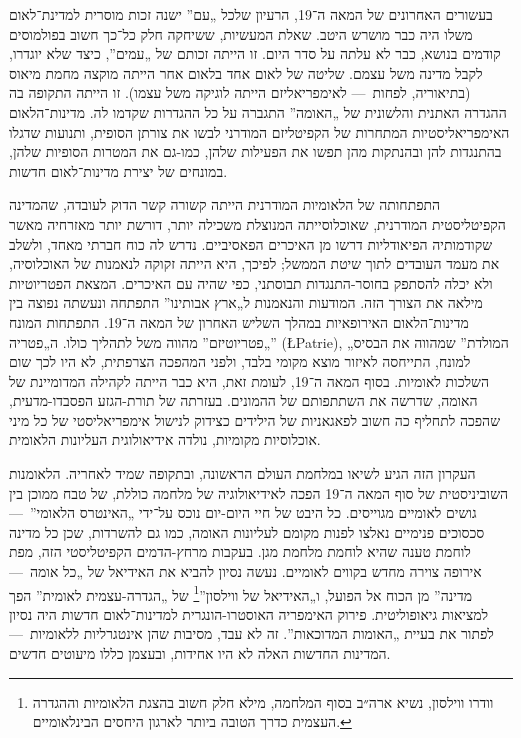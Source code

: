 בעשורים האחרונים של המאה ה־19, הרעיון שלכל „עם” ישנה זכות מוסרית למדינת־לאום משלו היה כבר מושרש היטב. שאלת המעשיות, ששיחקה חלק כל־כך חשוב בפולמוסים קודמים בנושא, כבר לא עלתה על סדר היום. זו הייתה זכותם של „עמים”, כיצד שלא יוגדרו, לקבל מדינה משל עצמם. שליטה של לאום אחד בלאום אחר הייתה מוקצה מחמת מיאוס (בתיאוריה, לפחות~— לאימפריאליזם הייתה לוגיקה משל עצמו). זו הייתה התקופה בה ההגדרה האתנית והלשונית של „האומה” התגברה על כל ההגדרות שקדמו לה. מדינות־הלאום האימפריאליסטיות המתחרות של הקפיטליזם המודרני לבשו את צורתן הסופית, ותנועות שדגלו בהתנגדות להן ובהנתקות מהן תפשו את הפעילות שלהן, כמו-גם את המטרות הסופיות שלהן, במונחים של יצירת מדינות־לאום חדשות.

התפתחותה של הלאומיות המודרנית הייתה קשורה קשר הדוק לעובדה, שהמדינה הקפיטליסטית המודרנית, שאוכלוסייתה המנוצלת משכילה יותר, דורשת יותר מאזרחיה מאשר שקודמותיה הפיאודליות דרשו מן האיכרים הפאסיביים. נדרש לה כוח חברתי מאחד, ולשלב את מעמד העובדים לתוך שיטת הממשל; לפיכך, היא הייתה זקוקה לנאמנות של האוכלוסיה, ולא יכלה להסתפק בחוסר-התנגדות תבוסתני, כפי שהיה עם האיכרים. המצאת הפטריוטיות מילאה את הצורך הזה. המודעות והנאמנות ל„ארץ אבותינו” התפתחה ונעשתה נפוצה בין מדינות־הלאום האירופאיות במהלך השליש האחרון של המאה ה־19. התפתחות המונח „פטריוטיזם” מהווה משל לתהליך כולו. ה„פטריה” (\L{Patrie}), „המולדת” שמהווה את הבסיס למונח, התייחסה לאיזור מוצא מקומי בלבד, ולפני המהפכה הצרפתית, לא היו לכך שום השלכות לאומיות. בסוף המאה ה־19, לעומת זאת, היא כבר הייתה לקהילה המדומיינת של האומה, שדרשה את השתתפותם של ההמונים. בעזרתה של תורת-הגזע הפסבדו-מדעית, שהפכה לתחליף כה חשוב לפאגאניות של הילידים כצידוק לנישול אימפריאליסטי של כל מיני אוכלוסיות מקומיות, נולדה אידיאולוגית העליונות הלאומית.

העקרון הזה הגיע לשיאו במלחמת העולם הראשונה, ובתקופה שמיד לאחריה. הלאומנות השוביניסטית של סוף המאה ה־19 הפכה לאידיאולוגיה של מלחמה כוללת, של טבח ממוכן בין גושים לאומיים מגוייסים. כל היבט של חיי היום-יום נוכס על־ידי „האינטרס הלאומי”~— סכסוכים פנימיים נאלצו לפנות מקומם לעליונות האומה, כמו גם להשרדות, שכן כל מדינה לוחמת טענה שהיא לוחמת מלחמת מגן. בעקבות מרחץ-הדמים הקפיטליסטי הזה, מפת אירופה צוירה מחדש בקווים לאומיים. נעשה נסיון להביא את האידיאל של „כל אומה~— מדינה” מן הכוח אל הפועל, ו„האידיאל של ווילסון”\footnote{וודרו ווילסון, נשיא ארה״ב בסוף המלחמה, מילא חלק חשוב בהצגת הלאומיות וההגדרה העצמית כדרך הטובה ביותר לארגון היחסים הבינלאומיים.} של „הגדרה-עצמית לאומית” הפך למציאות גיאופוליטית. פירוק האימפריה האוסטרו-הונגרית למדינות־לאום חדשות היה נסיון לפתור את בעיית „האומות המדוכאות”. זה לא עבד, מסיבות שהן אינטגרליות ללאומיות~— המדינות החדשות האלה לא היו אחידות, ובעצמן כללו מיעוטים חדשים.

